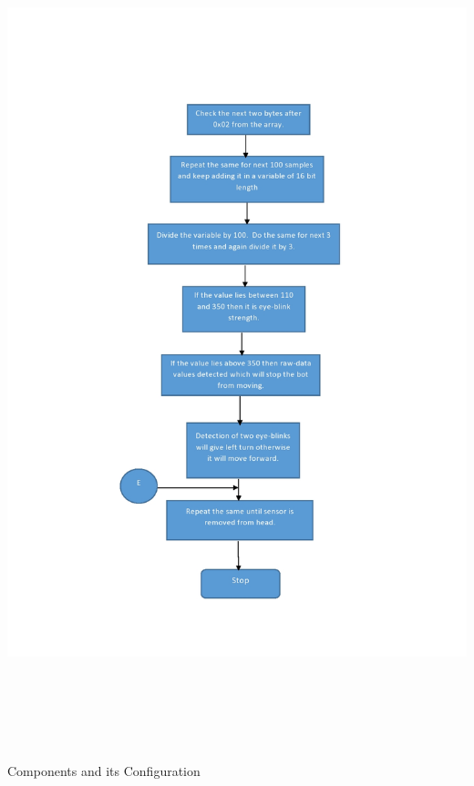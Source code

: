 \documentclass[14pt]{article}
\begin{document}
\begin{center}
	\graphicspath{ {images/} }
	\includegraphics[width=18cm, height=24cm]{Flowchart3}
\end{center}

\break

\begin{center}
{\Huge Components and its Configuration}
\end{center}
\end{document}
